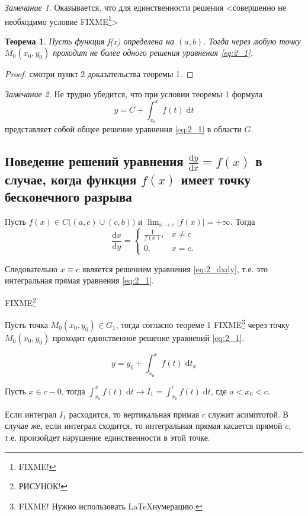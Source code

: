 \documentclass[a4paper,10pt]{report}
\newcommand{\ud}{\mathrm{d}}
\newtheorem{theorem}{Теорема}[section]
\theoremstyle{definition}
\theoremstyle{remark}
\newtheorem{note}{Замечание}[section]
\theoremstyle{plain}
\begin{document}
\begin{note}
 Оказывается, что для единственности решения <совершенно не необходимо условие FIXME\footnote{FIXME!}>
\end{note}
\begin{theorem}
 Пусть функция f(x) определена на $(a,b)$. Тогда через любую точку $M_0(x_0,y_0)$ проходит не более одного решения уравнения \eqref{eq:2_1}.
\end{theorem}
\begin{proof}
 смотри пункт 2 доказательства теоремы 1.
\end{proof}
\begin{note}
 Не трудно убедится, что при условии теоремы 1 формула
 \[
  y = C + \int_{x_0}^x f(t)\; \ud t
 \]
 представляет собой общее решение уравнения \eqref{eq:2_1} в области $G$.
\end{note}

\subsection{Поведение решений уравнения $\displaystyle\frac{\ud y}{\ud x} = f(x)$ в случае, когда функция $f(x)$ имеет точку бесконечного разрыва}
Пусть $f(x) \in C\big((a,c) \cup (c,b)\big)$ и $\displaystyle\lim_{x \to c} |f(x)| = +\infty$. Тогда
\begin{equation}
 \frac{\ud x}{\ud y} = \begin{cases}
  \frac{1}{f(x)}, & x \ne c \\
  0, & x = c.
 \end{cases}
 \label{eq:2_dxdy}
\end{equation}

Следовательно $x \equiv c$ является решением уравнения \eqref{eq:2_dxdy}, т.е. это интегральная прямая уравнения \eqref{eq:2_1}.

FIXME\footnote{РИСУНОК!}

Пусть точка $M_0(x_0,y_0) \in G_1$, тогда согласно теореме 1 FIXME\footnote{FIXME! Нужно использовать \LaTeX нумерацию.} через точку $M_0(x_0,y_0)$ проходит единственное решение уравнений \eqref{eq:2_1}.

\[
 y = y_0 + \int_{x_0}^x f(t)\; \ud t_x
\]

Пусть $x \in c-0$, тогда $\int_{x_0}^x f(t)\; \ud t \to I_1 = \int_{x_0}^c f(t)\; \ud t$, где $a < x_0 < c$.

Если интеграл $I_1$ расходится, то вертикальная примая $c$ служит асимптотой. В случае же, если интеграл сходится, то интегральная прямая касается прямой $c$, т.е. произойдет нарушение единственности в этой точке.
\end{document}
